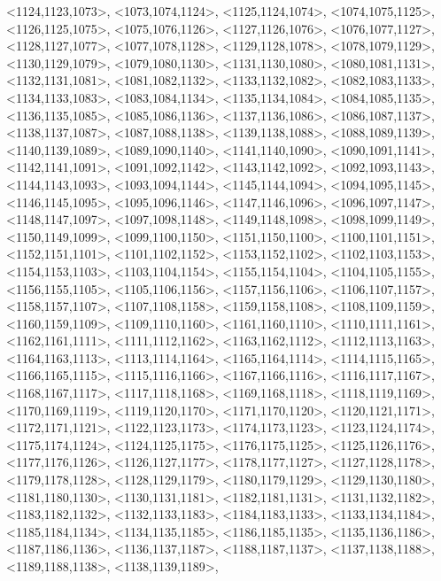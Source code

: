 \documentclass[a4paper,10pt]{article}
\begin{document}
\begin{eulernotebook}
\begin{euleroutput}
  <1124,1123,1073>,
  <1073,1074,1124>,
  <1125,1124,1074>,
  <1074,1075,1125>,
  <1126,1125,1075>,
  <1075,1076,1126>,
  <1127,1126,1076>,
  <1076,1077,1127>,
  <1128,1127,1077>,
  <1077,1078,1128>,
  <1129,1128,1078>,
  <1078,1079,1129>,
  <1130,1129,1079>,
  <1079,1080,1130>,
  <1131,1130,1080>,
  <1080,1081,1131>,
  <1132,1131,1081>,
  <1081,1082,1132>,
  <1133,1132,1082>,
  <1082,1083,1133>,
  <1134,1133,1083>,
  <1083,1084,1134>,
  <1135,1134,1084>,
  <1084,1085,1135>,
  <1136,1135,1085>,
  <1085,1086,1136>,
  <1137,1136,1086>,
  <1086,1087,1137>,
  <1138,1137,1087>,
  <1087,1088,1138>,
  <1139,1138,1088>,
  <1088,1089,1139>,
  <1140,1139,1089>,
  <1089,1090,1140>,
  <1141,1140,1090>,
  <1090,1091,1141>,
  <1142,1141,1091>,
  <1091,1092,1142>,
  <1143,1142,1092>,
  <1092,1093,1143>,
  <1144,1143,1093>,
  <1093,1094,1144>,
  <1145,1144,1094>,
  <1094,1095,1145>,
  <1146,1145,1095>,
  <1095,1096,1146>,
  <1147,1146,1096>,
  <1096,1097,1147>,
  <1148,1147,1097>,
  <1097,1098,1148>,
  <1149,1148,1098>,
  <1098,1099,1149>,
  <1150,1149,1099>,
  <1099,1100,1150>,
  <1151,1150,1100>,
  <1100,1101,1151>,
  <1152,1151,1101>,
  <1101,1102,1152>,
  <1153,1152,1102>,
  <1102,1103,1153>,
  <1154,1153,1103>,
  <1103,1104,1154>,
  <1155,1154,1104>,
  <1104,1105,1155>,
  <1156,1155,1105>,
  <1105,1106,1156>,
  <1157,1156,1106>,
  <1106,1107,1157>,
  <1158,1157,1107>,
  <1107,1108,1158>,
  <1159,1158,1108>,
  <1108,1109,1159>,
  <1160,1159,1109>,
  <1109,1110,1160>,
  <1161,1160,1110>,
  <1110,1111,1161>,
  <1162,1161,1111>,
  <1111,1112,1162>,
  <1163,1162,1112>,
  <1112,1113,1163>,
  <1164,1163,1113>,
  <1113,1114,1164>,
  <1165,1164,1114>,
  <1114,1115,1165>,
  <1166,1165,1115>,
  <1115,1116,1166>,
  <1167,1166,1116>,
  <1116,1117,1167>,
  <1168,1167,1117>,
  <1117,1118,1168>,
  <1169,1168,1118>,
  <1118,1119,1169>,
  <1170,1169,1119>,
  <1119,1120,1170>,
  <1171,1170,1120>,
  <1120,1121,1171>,
  <1172,1171,1121>,
  <1122,1123,1173>,
  <1174,1173,1123>,
  <1123,1124,1174>,
  <1175,1174,1124>,
  <1124,1125,1175>,
  <1176,1175,1125>,
  <1125,1126,1176>,
  <1177,1176,1126>,
  <1126,1127,1177>,
  <1178,1177,1127>,
  <1127,1128,1178>,
  <1179,1178,1128>,
  <1128,1129,1179>,
  <1180,1179,1129>,
  <1129,1130,1180>,
  <1181,1180,1130>,
  <1130,1131,1181>,
  <1182,1181,1131>,
  <1131,1132,1182>,
  <1183,1182,1132>,
  <1132,1133,1183>,
  <1184,1183,1133>,
  <1133,1134,1184>,
  <1185,1184,1134>,
  <1134,1135,1185>,
  <1186,1185,1135>,
  <1135,1136,1186>,
  <1187,1186,1136>,
  <1136,1137,1187>,
  <1188,1187,1137>,
  <1137,1138,1188>,
  <1189,1188,1138>,
  <1138,1139,1189>,

\end{euleroutput}
\end{eulernotebook}
\end{document}
